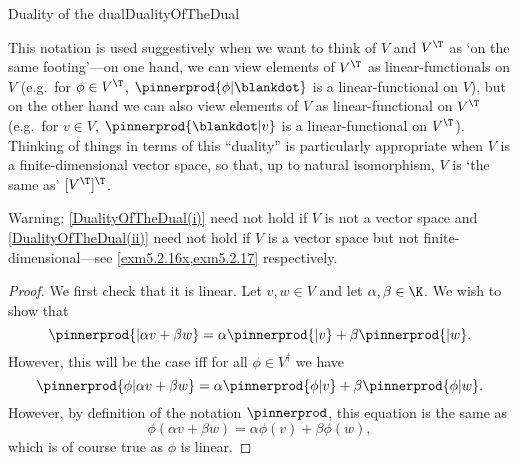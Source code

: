 \begin{thm}{Duality of the dual}{DualityOfTheDual}
\begin{rmk}
		This notation is used suggestively when we want to think of $V$ and $V^{\T}$ as `on the same footing'---on one hand, we can view elements of $V^{\T}$ as linear-functionals on $V$ (e.g.~for $\phi \in V^{\T}$, $\pinnerprod{\phi |\blankdot}$ is a linear-functional on $V$), but on the other hand we can also view elements of $V$ as linear-functional on $V^{\T}$ (e.g.~for $v\in V$, $\pinnerprod{\blankdot |v}$ is a linear-functional on $V^{\T}$).  Thinking of things in terms of this ``duality'' is particularly appropriate when $V$ is a finite-dimensional vector space, so that, up to natural isomorphism, $V$ is `the same as' $[V^{\T}]^{\T}$.
	\end{rmk}
	\begin{rmk}
		Warning:  \cref{DualityOfTheDual(i)} need not hold if $V$ is not a vector space and \cref{DualityOfTheDual(ii)} need not hold if $V$ is a vector space but not finite-dimensional---see \cref{exm5.2.16x,exm5.2.17} respectively.
	\end{rmk}
	\begin{proof}
		We first check that it is linear.  Let $v,w\in V$ and let $\alpha ,\beta \in \K$.  We wish to show that
		\begin{equation}
			\pinnerprod{|\alpha v+\beta w}=\alpha \pinnerprod{|v}+\beta \pinnerprod{|w}.
		\end{equation}
		However, this will be the case iff for all $\phi \in V^{\dagger}$ we have
		\begin{equation}
			\pinnerprod{\phi|\alpha v+\beta w}=\alpha \pinnerprod{\phi |v}+\beta \pinnerprod{\phi |w}.
		\end{equation}
		However, by definition of the notation $\pinnerprod$, this equation is the same as
		\begin{equation}
			\phi (\alpha v+\beta w)=\alpha \phi (v)+\beta \phi (w),
		\end{equation}
		which is of course true as $\phi$ is linear.


\end{proof}
\end{thm}
